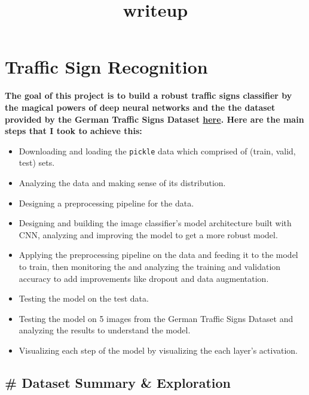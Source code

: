 \documentclass[11pt]{article}
\title{writeup}
\providecommand{\tightlist}{%
      \setlength{\itemsep}{0pt}\setlength{\parskip}{0pt}}
\begin{document}
    
    
    \maketitle
    
    

    
    \hypertarget{traffic-sign-recognition}{%
\section{Traffic Sign Recognition}\label{traffic-sign-recognition}}

\textbf{The goal of this project is to build a robust traffic signs
classifier by the magical powers of deep neural networks and the the
dataset provided by the German Traffic Signs Dataset
\href{http://benchmark.ini.rub.de/?section=gtsrb\&subsection=dataset}{here}.
Here are the main steps that I took to achieve this:}

\begin{itemize}
\tightlist
\item
  Downloading and loading the \texttt{pickle} data which comprised of
  (train, valid, test) sets.
\item
  Analyzing the data and making sense of its distribution.
\item
  Designing a preprocessing pipeline for the data.
\item
  Designing and building the image classifier's model architecture built
  with CNN, analyzing and improving the model to get a more robust
  model.\\
\item
  Applying the preprocessing pipeline on the data and feeding it to the
  model to train, then monitoring the and analyzing the training and
  validation accuracy to add improvements like dropout and data
  augmentation.
\item
  Testing the model on the test data.
\item
  Testing the model on 5 images from the German Traffic Signs Dataset
  and analyzing the results to understand the model.
\item
  Visualizing each step of the model by visualizing the each layer's
  activation.
\end{itemize}

    \hypertarget{dataset-summary-exploration}{%
\subsection{\# Dataset Summary \&
Exploration}\label{dataset-summary-exploration}}
\end{document}
